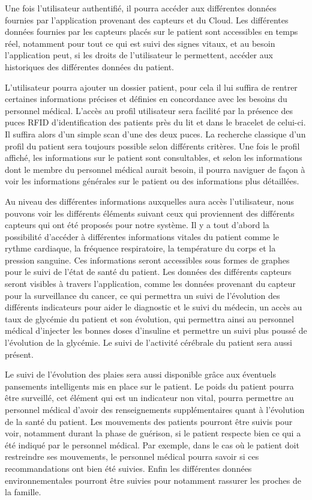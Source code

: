 Une fois l’utilisateur authentifié, il pourra accéder aux différentes données fournies par l’application provenant des capteurs et
du Cloud. Les différentes données fournies par les capteurs placés sur le patient sont accessibles en temps réel, notamment pour
tout ce qui est suivi des signes vitaux, et au besoin l’application peut, si les droits de l’utilisateur le permettent, accéder
aux historiques des différentes données du patient.

L’utilisateur pourra ajouter un dossier patient, pour cela il lui suffira de rentrer certaines informations précises et définies en concordance avec les besoins du personnel médical. L’accès au profil utilisateur sera facilité par la présence des puces RFID d’identification des patients près du lit et dans le bracelet de celui-ci. Il suffira alors d’un simple scan d’une des deux puces. La recherche classique d’un profil du patient sera toujours possible selon différents critères. Une fois le profil affiché, les informations sur le patient sont consultables, et selon les informations dont le membre du personnel médical aurait besoin, il pourra naviguer de façon à voir les informations générales sur le patient ou des informations plus détaillées.

Au niveau des différentes informations auxquelles aura accès l’utilisateur, nous pouvons voir les différents éléments suivant ceux qui
proviennent des différents capteurs qui ont été proposés pour notre système. Il y a tout d’abord la possibilité d’accéder à
différentes informations vitales du patient comme le rythme cardiaque, la fréquence respiratoire, la
température du corps et la pression sanguine. Ces informations seront accessibles sous formes de graphes pour le suivi de l’état
de santé du patient. Les données des différents capteurs seront visibles à travers l’application, comme les données provenant du capteur pour la surveillance du cancer, ce qui permettra un suivi de l’évolution des différents indicateurs pour aider le diagnostic et le suivi du médecin, un accès au taux de glycémie du patient et son évolution, qui permettra ainsi au personnel médical d’injecter les bonnes doses d’insuline et permettre un suivi plus poussé de l’évolution de la glycémie. Le suivi de l’activité cérébrale du patient sera aussi présent.

Le suivi de l’évolution des plaies sera aussi disponible grâce aux éventuels pansements intelligents mis en place sur le patient.
Le poids du patient pourra être surveillé, cet élément qui est un indicateur non vital, pourra permettre au personnel médical
d’avoir des renseignements supplémentaires quant à l’évolution de la santé du patient. Les mouvements des patients pourront être
suivis pour voir, notamment durant la phase de guérison, si le patient respecte bien ce qui a été indiqué par le personnel
médical. Par exemple, dans le cas où le patient doit restreindre ses mouvements, le personnel médical pourra savoir si ces
recommandations ont bien été suivies. Enfin les différentes données environnementales pourront être suivies pour notamment rassurer
les proches de la famille.

